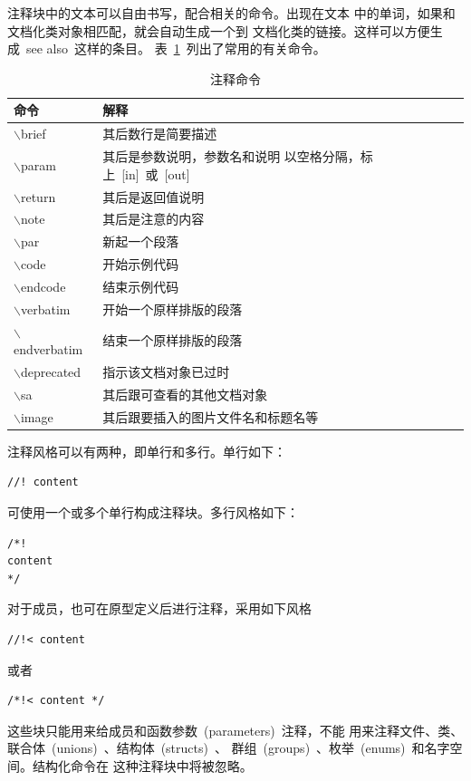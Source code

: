 注释块中的文本可以自由书写，配合相关的命令。出现在文本
中的单词，如果和文档化类对象相匹配，就会自动生成一个到
文档化类的链接。这样可以方便生成~see also~这样的条目。
表~\ref{tab:design:doc_cmd}~列出了常用的有关命令。

\begin{table}[t]
  \centering
  \caption{注释命令}\label{tab:design:doc_cmd}
\begin{tabular}{|l|l|}
  \hline
  \textbf{命令} & \textbf{解释} \\
  \hline\hline
  $\backslash$brief & 其后数行是简要描述 \\
  \hline
  $\backslash$param & 其后是参数说明，参数名和说明
以空格分隔，标上~[in]~或~[out] \\
  \hline
  $\backslash$return & 其后是返回值说明 \\
  \hline
  $\backslash$note & 其后是注意的内容 \\
  \hline
  $\backslash$par & 新起一个段落 \\
  \hline
  $\backslash$code & 开始示例代码 \\
  \hline
  $\backslash$endcode & 结束示例代码 \\
  \hline
  $\backslash$verbatim & 开始一个原样排版的段落 \\
  \hline
  $\backslash$endverbatim & 结束一个原样排版的段落 \\
  \hline
  $\backslash$deprecated & 指示该文档对象已过时 \\
  \hline
  $\backslash$sa & 其后跟可查看的其他文档对象 \\
  \hline
  $\backslash$image & 其后跟要插入的图片文件名和标题名等 \\
  \hline
\end{tabular}

\end{table}

注释风格可以有两种，即单行和多行。单行如下：
\begin{verbatim}
//! content
\end{verbatim}
可使用一个或多个单行构成注释块。多行风格如下：
\begin{verbatim}
/*!
content
*/
\end{verbatim}

对于成员，也可在原型定义后进行注释，采用如下风格
\begin{verbatim}
//!< content
\end{verbatim}
或者
\begin{verbatim}
/*!< content */
\end{verbatim}
这些块只能用来给成员和函数参数~(parameters)~注释，不能
用来注释文件、类、联合体~(unions)~、结构体~(structs)~、
群组~(groups)~、枚举~(enums)~和名字空间。结构化命令在
这种注释块中将被忽略。

